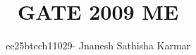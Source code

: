 \documentclass[journal]{IEEEtran}
\begin{document}

\vspace{3cm}


\title{GATE 2009 ME }
\author{ee25btech11029- Jnanesh Sathisha Karmar}
\maketitle
{\let\newpage\relax\maketitle}

\renewcommand{\thefigure}{\theenumi}
\renewcommand{\thetable}{\theenumi}
\setlength{\intextsep}{10pt} %
\end{document}

